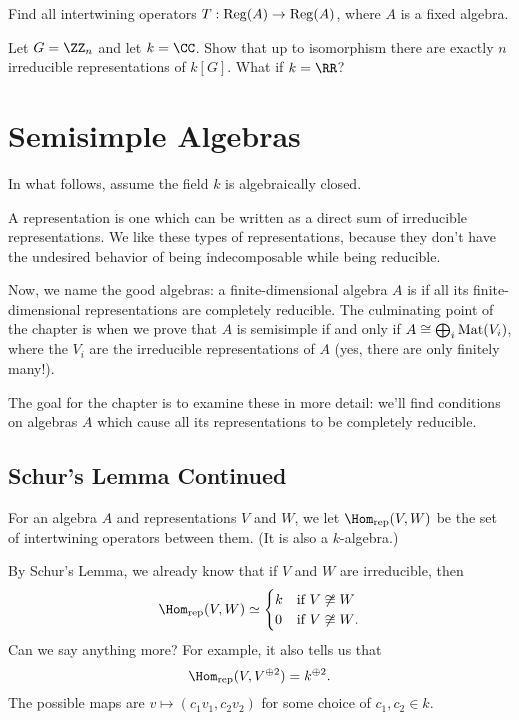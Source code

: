 \documentclass[11pt]{scrreprt}
\begin{document}
\begin{sproblem}
	\label{prob:regA_intertwine}
	Find all intertwining operators $T : \operatorname{Reg}(A) \to \operatorname{Reg}(A)$,
	where $A$ is a fixed algebra.
\end{sproblem}

\begin{problem}
	Let $G = \Zc n$ and let $k = \CC$.
	Show that up to isomorphism there are exactly $n$
	irreducible representations of $k[G]$.
	What if $k = \RR$?
\end{problem}

\chapter{Semisimple Algebras}
In what follows, assume the field $k$ is algebraically closed.

A  representation is one which
can be written as a direct sum of irreducible representations.
We like these types of representations, because they don't have the
undesired behavior of being indecomposable while being reducible.

Now, we name the good algebras:
a finite-dimensional algebra $A$ is 
if all its finite-dimensional representations are completely reducible.
The culminating point of the chapter is when we
prove that $A$ is semisimple if and only if
$A \cong \bigoplus_i \mathrm{Mat}(V_i)$,
where the $V_i$ are the irreducible representations of $A$
(yes, there are only finitely many!).

The goal for the chapter is to examine these in more detail:
we'll find conditions on algebras $A$ which cause all its representations
to be completely reducible.


\section{Schur's Lemma Continued}
\begin{definition}
	For an algebra $A$ and representations $V$ and $W$,
	we let $\Homrep(V,W)$ be the set of intertwining operators between them.
	(It is also a $k$-algebra.)
\end{definition}

By Schur's Lemma, we already know that if $V$ and $W$ are irreducible,
then
\[
	\Homrep(V,W) \simeq
	\begin{cases}
		k & \text{if $V \not\cong W$} \\
		0 & \text{if $V \not\cong W$}.
	\end{cases}
\]
Can we say anything more?
For example, it also tells us that 
\[ \Homrep(V, V^{\oplus 2}) = k^{\oplus 2}. \]
The possible maps are $v \mapsto (c_1v_1, c_2v_2)$ for some choice of $c_1, c_2 \in k$.
\end{document}
